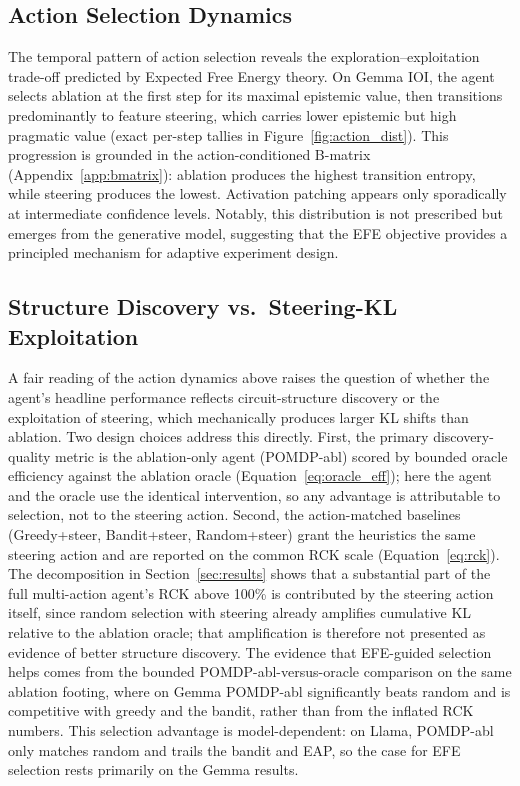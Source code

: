
\subsection{Action Selection Dynamics}

The temporal pattern of action selection reveals the exploration--exploitation trade-off predicted by Expected Free Energy theory. On Gemma IOI, the agent selects ablation at the first step for its maximal epistemic value, then transitions predominantly to feature steering, which carries lower epistemic but high pragmatic value (exact per-step tallies in Figure~\ref{fig:action_dist}). This progression is grounded in the action-conditioned B-matrix (Appendix~\ref{app:bmatrix}): ablation produces the highest transition entropy, while steering produces the lowest. Activation patching appears only sporadically at intermediate confidence levels. Notably, this distribution is not prescribed but emerges from the generative model, suggesting that the EFE objective provides a principled mechanism for adaptive experiment design.

\subsection{Structure Discovery vs.\ Steering-KL Exploitation}
\label{sec:structure_vs_steering}

A fair reading of the action dynamics above raises the question of whether
the agent's headline performance reflects circuit-structure discovery
or the exploitation of steering, which mechanically produces larger KL
shifts than ablation. Two design choices address this directly. First, the
primary discovery-quality metric is the ablation-only agent (POMDP-abl) scored
by bounded oracle efficiency against the ablation oracle
(Equation~\ref{eq:oracle_eff}); here the agent and the oracle use the identical
intervention, so any advantage is attributable to selection, not to the
steering action. Second, the action-matched baselines (Greedy+steer, Bandit+steer,
Random+steer) grant the heuristics the same steering action and are reported
on the common RCK scale (Equation~\ref{eq:rck}). The decomposition in
Section~\ref{sec:results} shows that a substantial part of the full multi-action
agent's RCK above 100\% is contributed by the steering action itself, since random
selection with steering already amplifies cumulative KL relative to the ablation
oracle; that amplification is therefore not presented as evidence of
better structure discovery. The evidence that EFE-guided selection helps comes
from the bounded POMDP-abl-versus-oracle comparison on the same ablation footing,
where on Gemma POMDP-abl significantly beats random and is competitive with greedy and the
bandit, rather than from the inflated RCK numbers. This selection advantage is
model-dependent: on Llama, POMDP-abl only matches random and trails the bandit and
EAP, so the case for EFE selection rests primarily on the Gemma results.

